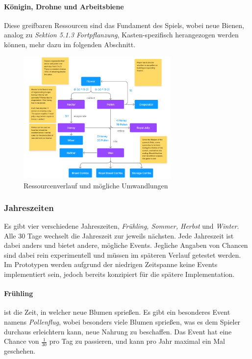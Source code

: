 \paragraph{Königin, Drohne und Arbeitsbiene}
Diese greifbaren Ressourcen sind das Fundament des Spiels, wobei neue Bienen, analog zu \textit{Sektion 5.1.3 Fortpflanzung}, Kasten-spezifisch herangezogen werden können, mehr dazu im folgenden Abschnitt.

\begin{figure}
    \begin{center}
        \includegraphics[width=300px]{0.bilder/resourceloop.png}
    \end{center}
    \caption{Ressourcenverlauf und mögliche Umwandlungen} \label{image:resourceloop}
\end{figure}

\subsubsection{Jahreszeiten}
Es gibt vier verschiedene Jahreszeiten, \textit{Frühling, Sommer, Herbst} und \textit{Winter}. Alle 30 Tage wechselt die Jahreszeit zur jeweils nächsten. Jede Jahreszeit ist dabei anders und bietet andere, mögliche Events. Jegliche Angaben von Chancen sind dabei rein experimentell und müssen im späteren Verlauf getestet werden. Im Prototypen werden aufgrund der niedrigen Zeitspanne keine Events implementiert sein, jedoch bereits konzipiert für die spätere Implementation.

\paragraph{Frühling} ist die Zeit, in welcher neue Blumen sprießen. Es gibt ein besonderes Event namens \textit{Pollenflug}, wobei besonders viele Blumen sprießen, was es dem Spieler durchaus erleichtern kann, neue Nahrung zu beschaffen. Das Event hat eine Chance von $\frac{1}{30}$ pro Tag zu passieren, und kann pro Jahr maximal ein Mal geschehen.

